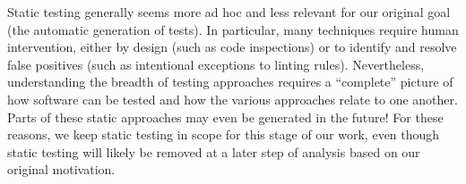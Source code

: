 

    Static testing generally seems more ad hoc and less relevant for our
    original goal (the automatic generation of tests). In particular, many
    techniques require human intervention, either by design (such as code
    inspections) or to identify and resolve false positives (such as
    intentional exceptions to linting rules). Nevertheless, understanding
    the breadth of testing approaches requires a ``complete'' picture of how
    software can be tested and how the various approaches relate to one another.
    Parts of these static approaches may even be generated in the
    future! For these reasons, we keep static testing in scope for this stage
    of our work, even though static testing will likely be removed at a later
    step of analysis based on our original motivation.

